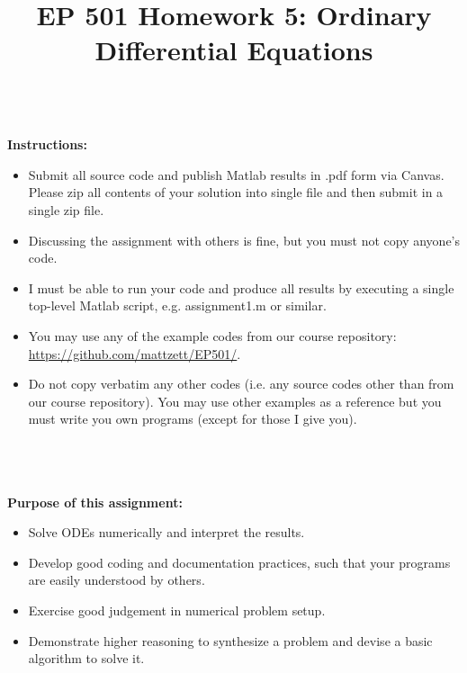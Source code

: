\documentclass{article}
\begin{document}
\title{EP 501 Homework 5:  Ordinary Differential Equations}

\maketitle

~\\
\textbf{Instructions:}  
\begin{itemize}
  \item Submit all source code and publish Matlab results in .pdf form via Canvas.  Please zip all contents of your solution into single file and then submit in a single zip file.    
  \item Discussing the assignment with others is fine, but you must not copy anyone's code.  
  \item I must be able to run your code and produce all results by executing a single top-level Matlab script, e.g. \textsf{assignment1.m} or similar.  
  \item You may use any of the example codes from our course repository:  \url{https://github.com/mattzett/EP501/}.
  \item Do not copy verbatim any other codes (i.e. any source codes other than from our course repository).  You may use other examples as a reference but you must write you own programs (except for those I give you).  

\end{itemize}
~\\~\\~\\
\textbf{Purpose of this assignment:}  
\begin{itemize}
  \item Solve ODEs numerically and interpret the results.  
  \item Develop good coding and documentation practices, such that your programs are easily understood by others.  
  \item Exercise good judgement in numerical problem setup.
  \item Demonstrate higher reasoning to synthesize a problem and devise a basic algorithm to solve it.  
\end{itemize}

\pagebreak
\end{document}
